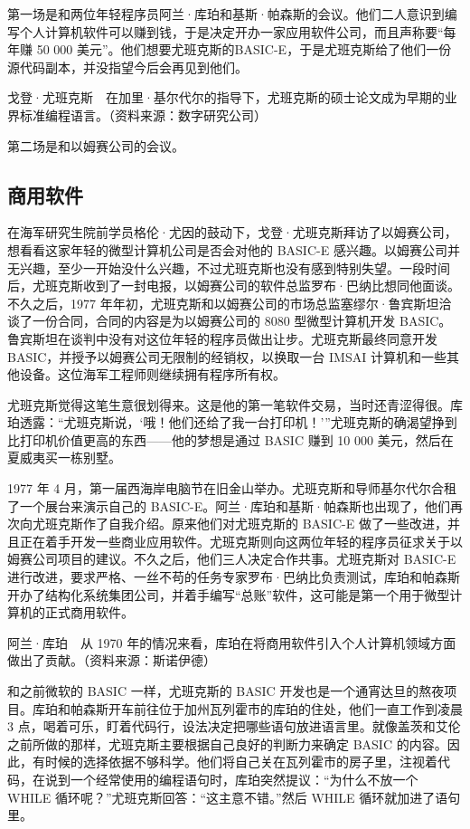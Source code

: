 \documentclass[12pt,UTF8]{ctexbook}
\begin{document}
第一场是和两位年轻程序员阿兰·库珀和基斯·帕森斯的会议。他们二人意识到编写个人计算机软件可以赚到钱，于是决定开办一家应用软件公司，而且声称要“每年赚 50 000 美元”。他们想要尤班克斯的BASIC-E，于是尤班克斯给了他们一份源代码副本，并没指望今后会再见到他们。



戈登·尤班克斯　在加里·基尔代尔的指导下，尤班克斯的硕士论文成为早期的业界标准编程语言。（资料来源：数字研究公司）

第二场是和以姆赛公司的会议。





\subsection{商用软件}


在海军研究生院前学员格伦·尤因的鼓动下，戈登·尤班克斯拜访了以姆赛公司，想看看这家年轻的微型计算机公司是否会对他的 BASIC-E 感兴趣。以姆赛公司并无兴趣，至少一开始没什么兴趣，不过尤班克斯也没有感到特别失望。一段时间后，尤班克斯收到了一封电报，以姆赛公司的软件总监罗布·巴纳比想同他面谈。不久之后，1977 年年初，尤班克斯和以姆赛公司的市场总监塞缪尔·鲁宾斯坦洽谈了一份合同，合同的内容是为以姆赛公司的 8080 型微型计算机开发 BASIC。鲁宾斯坦在谈判中没有对这位年轻的程序员做出让步。尤班克斯最终同意开发 BASIC，并授予以姆赛公司无限制的经销权，以换取一台 IMSAI 计算机和一些其他设备。这位海军工程师则继续拥有程序所有权。

尤班克斯觉得这笔生意很划得来。这是他的第一笔软件交易，当时还青涩得很。库珀透露：“尤班克斯说，‘哦！他们还给了我一台打印机！’”尤班克斯的确渴望挣到比打印机价值更高的东西——他的梦想是通过 BASIC 赚到 10 000 美元，然后在夏威夷买一栋别墅。

1977 年 4 月，第一届西海岸电脑节在旧金山举办。尤班克斯和导师基尔代尔合租了一个展台来演示自己的 BASIC-E。阿兰·库珀和基斯·帕森斯也出现了，他们再次向尤班克斯作了自我介绍。原来他们对尤班克斯的 BASIC-E 做了一些改进，并且正在着手开发一些商业应用软件。尤班克斯则向这两位年轻的程序员征求关于以姆赛公司项目的建议。不久之后，他们三人决定合作共事。尤班克斯对 BASIC-E 进行改进，要求严格、一丝不苟的任务专家罗布·巴纳比负责测试，库珀和帕森斯开办了结构化系统集团公司，并着手编写“总账”软件，这可能是第一个用于微型计算机的正式商用软件。



阿兰·库珀　从 1970 年的情况来看，库珀在将商用软件引入个人计算机领域方面做出了贡献。（资料来源：斯诺伊德）

和之前微软的 BASIC 一样，尤班克斯的 BASIC 开发也是一个通宵达旦的熬夜项目。库珀和帕森斯开车前往位于加州瓦列霍市的库珀的住处，他们一直工作到凌晨 3 点，喝着可乐，盯着代码行，设法决定把哪些语句放进语言里。就像盖茨和艾伦之前所做的那样，尤班克斯主要根据自己良好的判断力来确定 BASIC 的内容。因此，有时候的选择依据不够科学。他们将自己关在瓦列霍市的房子里，注视着代码，在说到一个经常使用的编程语句时，库珀突然提议：“为什么不放一个 WHILE 循环呢？”尤班克斯回答：“这主意不错。”然后 WHILE 循环就加进了语句里。
\end{document}
